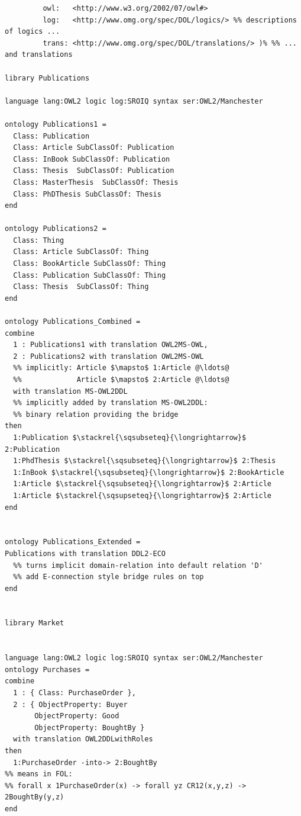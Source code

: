 \documentclass[10pt,fleqn,%
\ifpretendfinal
final%
\else
draft%
\fi,
]{scrreprt}
\begin{document}
\begin{lstlisting}[basicstyle=\ttfamily,language=dolText,morekeywords={props,ObjectProperty,Class,DisjointUnionOf,SubClassOf,Characteristics,Transitive,Asymmetric,SubPropertyOf,DisjointClasses,EquivalentTo,inverse,only,forall,iff,if,or,exists,distributed},escapechar=@,mathescape]
%prefix( :     <http://www.example.org/mereology#>
         owl:   <http://www.w3.org/2002/07/owl#>
         log:   <http://www.omg.org/spec/DOL/logics/> %% descriptions of logics ...
         trans: <http://www.omg.org/spec/DOL/translations/> )% %% ... and translations

library Publications

language lang:OWL2 logic log:SROIQ syntax ser:OWL2/Manchester

ontology Publications1 =
  Class: Publication
  Class: Article SubClassOf: Publication
  Class: InBook SubClassOf: Publication
  Class: Thesis  SubClassOf: Publication
  Class: MasterThesis  SubClassOf: Thesis
  Class: PhDThesis SubClassOf: Thesis
end

ontology Publications2 =
  Class: Thing
  Class: Article SubClassOf: Thing
  Class: BookArticle SubClassOf: Thing
  Class: Publication SubClassOf: Thing
  Class: Thesis  SubClassOf: Thing
end

ontology Publications_Combined =
combine
  1 : Publications1 with translation OWL2MS-OWL,
  2 : Publications2 with translation OWL2MS-OWL
  %% implicitly: Article $\mapsto$ 1:Article @\ldots@
  %%             Article $\mapsto$ 2:Article @\ldots@  
  with translation MS-OWL2DDL
  %% implicitly added by translation MS-OWL2DDL: 
  %% binary relation providing the bridge
then
  1:Publication $\stackrel{\sqsubseteq}{\longrightarrow}$ 2:Publication
  1:PhdThesis $\stackrel{\sqsubseteq}{\longrightarrow}$ 2:Thesis
  1:InBook $\stackrel{\sqsubseteq}{\longrightarrow}$ 2:BookArticle
  1:Article $\stackrel{\sqsubseteq}{\longrightarrow}$ 2:Article
  1:Article $\stackrel{\sqsupseteq}{\longrightarrow}$ 2:Article
end


ontology Publications_Extended =
Publications with translation DDL2-ECO
  %% turns implicit domain-relation into default relation 'D'
  %% add E-connection style bridge rules on top
end


library Market


language lang:OWL2 logic log:SROIQ syntax ser:OWL2/Manchester
ontology Purchases =
combine
  1 : { Class: PurchaseOrder },
  2 : { ObjectProperty: Buyer
       ObjectProperty: Good
       ObjectProperty: BoughtBy }
  with translation OWL2DDLwithRoles
then
  1:PurchaseOrder -into-> 2:BoughtBy
%% means in FOL: 
%% forall x 1PurchaseOrder(x) -> forall yz CR12(x,y,z) -> 2BoughtBy(y,z)
end


\end{lstlisting}
\end{document}
